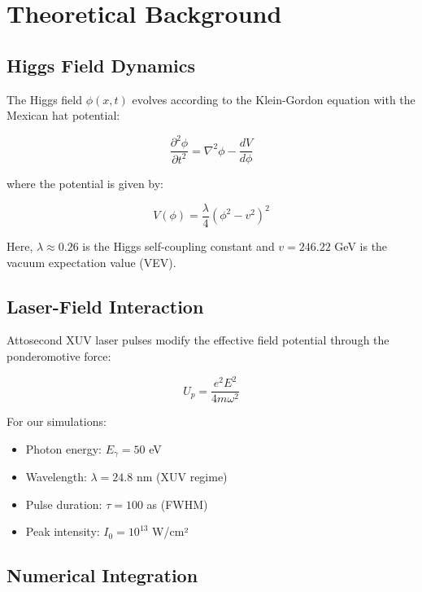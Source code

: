 \documentclass[12pt,a4paper]{article}
\begin{document}
\section{Theoretical Background}

\subsection{Higgs Field Dynamics}

The Higgs field $\phi(x,t)$ evolves according to the Klein-Gordon equation with the Mexican hat potential:

\begin{equation}
\frac{\partial^2 \phi}{\partial t^2} = \nabla^2 \phi - \frac{dV}{d\phi}
\end{equation}

where the potential is given by:

\begin{equation}
V(\phi) = \frac{\lambda}{4} \left( \phi^2 - v^2 \right)^2
\end{equation}

Here, $\lambda \approx 0.26$ is the Higgs self-coupling constant and $v = 246.22$ GeV is the vacuum expectation value (VEV).

\subsection{Laser-Field Interaction}

Attosecond XUV laser pulses modify the effective field potential through the ponderomotive force:

\begin{equation}
U_p = \frac{e^2 E^2}{4 m \omega^2}
\end{equation}

For our simulations:
\begin{itemize}
    \item Photon energy: $E_{\gamma} = 50$ eV
    \item Wavelength: $\lambda = 24.8$ nm (XUV regime)
    \item Pulse duration: $\tau = 100$ as (FWHM)
    \item Peak intensity: $I_0 = 10^{13}$ W/cm²
\end{itemize}

\subsection{Numerical Integration}
\end{document}
